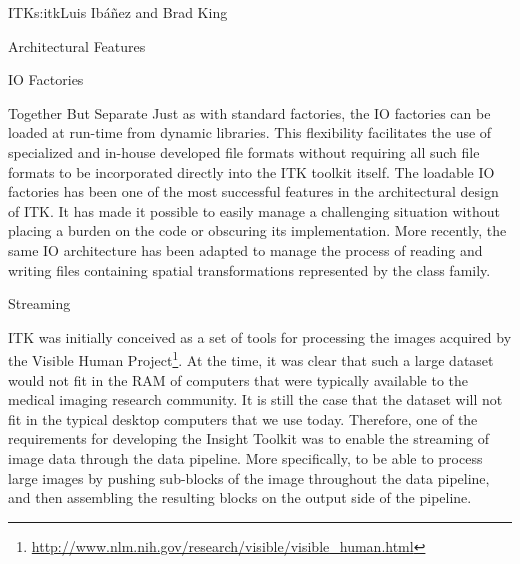 \begin{aosachapter}{ITK}{s:itk}{Luis Ib\'{a}\~{n}ez and Brad King}
\begin{aosasect1}{Architectural Features}
\begin{aosasect2}{IO Factories}
\begin{aosasect3}{Together But Separate}
Just as with standard factories, the IO factories can be loaded at
run-time from dynamic libraries. This flexibility facilitates the use of
specialized and in-house developed file formats without requiring all such file
formats to be incorporated directly into the ITK toolkit itself. The loadable
IO factories has been one of the most successful features in the architectural
design of ITK. It has made it possible to easily manage a challenging situation
without placing a burden on the code or obscuring its implementation. More
recently, the same IO architecture has been adapted to manage the process of
reading and writing files containing spatial transformations represented by the
 class family.

\end{aosasect3}

\end{aosasect2}

\begin{aosasect2}{Streaming}\label{sec.itk.streaming}

ITK was initially conceived as a set of tools for processing the images
acquired by the Visible Human
Project\footnote{\url{http://www.nlm.nih.gov/research/visible/visible_human.html}}.
At the time, it was clear that such a large dataset would not fit in the RAM of
computers that were typically available to the medical imaging research
community. It is still the case that the dataset will not fit in the typical
desktop computers that we use today. Therefore, one of the requirements for
developing the Insight Toolkit was to enable the streaming of image data
through the data pipeline. More specifically, to be able to process large
images by pushing sub-blocks of the image throughout the data pipeline, and then
assembling the resulting blocks on the output side of the pipeline.



\end{aosasect2}
\end{aosasect1}
\end{aosachapter}
